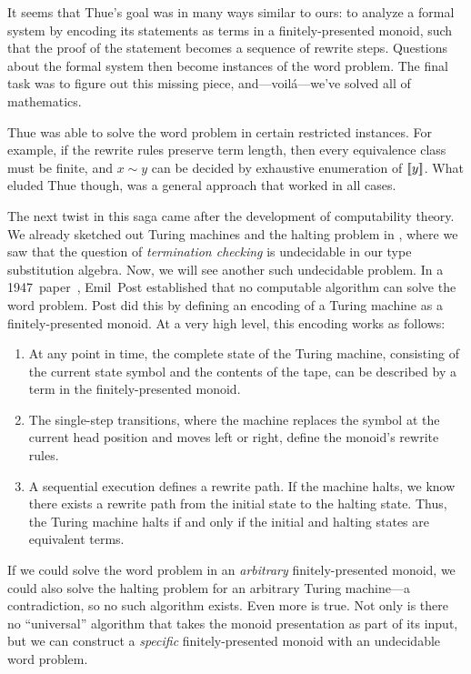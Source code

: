 \documentclass[../generics]{subfiles}
\begin{document}
It seems that Thue's goal was in many ways similar to ours: to analyze a formal system by encoding its statements as terms in a finitely-presented monoid, such that the proof of the statement becomes a sequence of rewrite steps. Questions about the formal system then become instances of the word problem. The final task was to figure out this missing piece, and---voil\'a---we've solved all of mathematics.

Thue was able to solve the word problem in certain restricted instances. For example, if the rewrite rules preserve term length, then every equivalence class must be finite, and $x\sim y$ can be decided by exhaustive enumeration of $[\![y]\!]$. What eluded Thue though, was a general approach that worked in all cases.

The next twist in this saga came after the development of computability theory. We already sketched out Turing machines and the halting problem in , where we saw that the question of \emph{termination checking} is undecidable in our type substitution algebra. Now, we will see another such undecidable problem. In a 1947~paper~\cite{post_1947}, Emil~Post established that no computable algorithm can solve the word problem. Post did this by defining an encoding of a Turing machine as a finitely-presented monoid. At a very high level, this encoding works as follows:
\begin{enumerate}
\item At any point in time, the complete state of the Turing machine, consisting of the current state symbol and the contents of the tape, can be described by a term in the finitely-presented monoid.
\item The single-step transitions, where the machine replaces the symbol at the current head position and moves left or right, define the monoid's rewrite rules.
\item A sequential execution defines a rewrite path. If the machine halts, we know there exists a rewrite path from the initial state to the halting state. Thus, the Turing machine halts if and only if the initial and halting states are equivalent terms.
\end{enumerate}
If we could solve the word problem in an \emph{arbitrary} finitely-presented monoid, we could also solve the halting problem for an arbitrary Turing machine---a contradiction, so no such algorithm exists. Even more is true. Not only is there no ``universal'' algorithm that takes the monoid presentation as part of its input, but we can construct a \emph{specific} finitely-presented monoid with an undecidable word problem.
\end{document}
